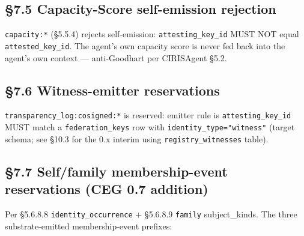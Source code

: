 \documentclass[11pt]{article}
\begin{document}
\subsection*{§7.5 Capacity-Score self-emission rejection}


\texttt{capacity:*} (§5.5.4) rejects self-emission: \texttt{attesting\_key\_id} MUST NOT equal \texttt{attested\_key\_id}. The agent's own capacity score is never fed back into the agent's own context — anti-Goodhart per CIRISAgent §5.2.


\subsection*{§7.6 Witness-emitter reservations}


\texttt{transparency\_log:cosigned:*} is reserved: emitter rule is \texttt{attesting\_key\_id} MUST match a \texttt{federation\_keys} row with \texttt{identity\_type="witness"} (target schema; see §10.3 for the 0.x interim using \texttt{registry\_witnesses} table).


\subsection*{§7.7 Self/family membership-event reservations (CEG 0.7 addition)}


Per §5.6.8.8 \texttt{identity\_occurrence} + §5.6.8.9 \texttt{family} subject\_kinds. The three substrate-emitted membership-event prefixes:
\end{document}
